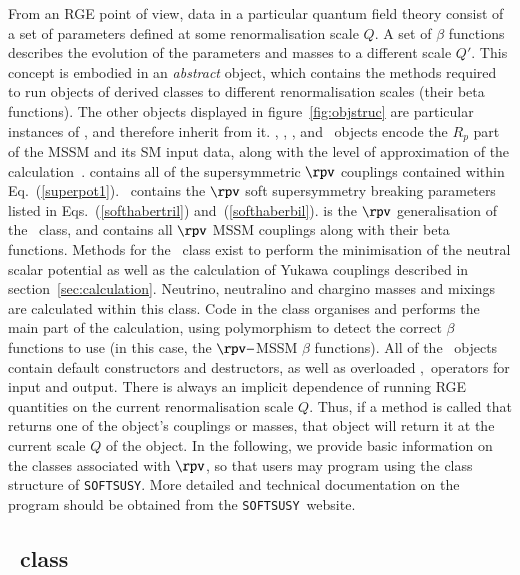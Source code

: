 \documentclass[final,3p,times,pdflatex]{elsarticle}
\def\SOFTSUSY{{\tt SOFTSUSY}}
\begin{document}
From an RGE point of view, data in a particular quantum field theory 
consist of a set of parameters defined at some
renormalisation scale $Q$. 
A set of $\beta$ functions describes the
evolution of the parameters and masses to a different scale
$Q'$. This concept is embodied in an {\em abstract} 
object, which contains the methods required to run objects of derived
classes to different renormalisation scales (their beta functions). The other
objects 
displayed in figure~\ref{fig:objstruc} are particular instances of
, and therefore inherit from it. , ,
,  and ~objects encode the
$R_p$ part of the 
MSSM and its SM input data, along with the level of approximation of the calculation~\cite{Allanach:2001kg}. 
 contains all of the supersymmetric $\rpv$ couplings contained
within  Eq.~(\ref{superpot1}). 
~contains the $\rpv$ soft supersymmetry breaking parameters
listed in 
Eqs.~(\ref{softhabertril}) and~(\ref{softhaberbil}).  is
the $\rpv$  
generalisation of the ~class, and contains all $\rpv$ MSSM
couplings along with their beta functions.
Methods for the ~class exist to perform the minimisation of
the neutral scalar potential as well as the
calculation of Yukawa couplings described in section~\ref{sec:calculation}. 
Neutrino, neutralino and chargino masses and mixings are calculated within
this class. 
Code in
the  class organises and performs the main part of
the calculation, using polymorphism to detect the correct $\beta$ functions to
use (in this case, the $\rpv-$MSSM $\beta$ functions). 
All of the ~objects contain default constructors
and destructors, as well as overloaded \code{>>},\code{<<}~operators for input
and output. 
There is always an implicit dependence of running RGE quantities on the
current renormalisation scale $Q$. Thus, if a method is called that returns
one of the object's couplings or masses, that object will return it at the
current scale $Q$ of the object. 
In the following, we provide basic information on the 
classes associated with $\rpv$, so that users may program using the class
structure of \SOFTSUSY\@. More detailed and
technical documentation on the program should be obtained from the
\SOFTSUSY~website. 


\subsection{~class}
\end{document}
